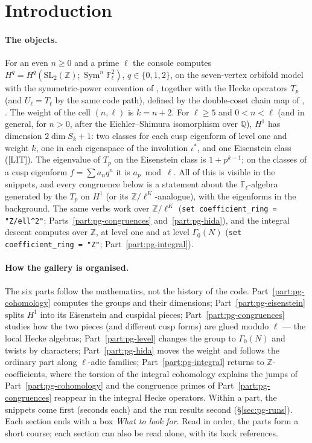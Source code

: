 \documentclass[11pt]{article}
\newcommand{\Z}{\mathbb{Z}}
\newcommand{\Q}{\mathbb{Q}}
\newcommand{\Fl}{\mathbb{F}_\ell}
\newcommand{\Sym}{\operatorname{Sym}}
\newcommand{\SL}{\mathrm{SL}}
\newcommand{\Ga}{\Gamma}
\newcommand{\code}[1]{\texttt{#1}}
\newcommand{\LIT}{\textsf{\small[LIT]}}
\begin{document}
\tableofcontents

\section{Introduction}\label{sec:pg-intro}

\paragraph{The objects.} For an even $n\ge0$ and a prime $\ell$ the console computes
$H^{q}=H^{q}(\SL_2(\Z);\Sym^{n}\Fl^{2})$, $q\in\{0,1,2\}$, on the seven-vertex orbifold model {} with the
symmetric-power convention of {}, together with the Hecke operators $T_p$ (and $U_\ell=T_\ell$ by the same
code path), defined by the double-coset chain map of {}, {\ttfamily[C,~eq:heckechain]}. The weight of the cell
$(n,\ell)$ is $k=n+2$. For $\ell\ge5$ and $0<n<\ell$ (and in general, for $n>0$, after the Eichler--Shimura isomorphism over $\Q$), $H^{1}$ has
dimension $2\dim S_k+1$: two classes for each cusp eigenform of level one and weight $k$, one in each eigenspace of the involution
$\iota^{*}$, and one Eisenstein class (\LIT). The eigenvalue of $T_p$ on the Eisenstein class is $1+p^{k-1}$; on the classes of a cusp
eigenform $f=\sum a_n q^n$ it is $a_p\bmod\ell$. All of this is visible in the snippets, and every congruence below is a statement about
the $\Fl$-algebra generated by the $T_p$ on $H^{1}$ (or its $\Z/\ell^{K}$-analogue), with the eigenforms in the background.
The same verbs work over $\Z/\ell^{K}$ (\code{set coefficient\_ring = "Z/ell\^{}2"}; Parts~\ref{part:pg-congruences} and~\ref{part:pg-hida}),
and the integral descent computes over $\Z$, at level one and at level $\Ga_0(N)$ (\code{set coefficient\_ring = "Z"}; Part~\ref{part:pg-integral}).

\paragraph{How the gallery is organised.} The six parts follow the mathematics, not the history of the code. Part~\ref{part:pg-cohomology}
computes the groups and their dimensions; Part~\ref{part:pg-eisenstein} splits $H^{1}$ into its Eisenstein and cuspidal pieces;
Part~\ref{part:pg-congruences} studies how the two pieces (and different cusp forms) are glued modulo $\ell$ --- the local Hecke algebras;
Part~\ref{part:pg-level} changes the group to $\Ga_0(N)$ and twists by characters; Part~\ref{part:pg-hida} moves the weight and follows
the ordinary part along $\ell$-adic families; Part~\ref{part:pg-integral} returns to $\Z$-coefficients, where the torsion of the integral
cohomology explains the jumps of Part~\ref{part:pg-cohomology} and the congruence primes of Part~\ref{part:pg-congruences} reappear in
the integral Hecke operators. Within a part, the snippets come first (seconds each) and the run results second
(\S\ref{sec:pg-runs}). Each section ends with a box \emph{What to look for}. Read in order, the parts form a short course; each section
can also be read alone, with its back references.
\end{document}
